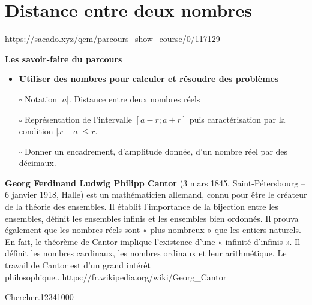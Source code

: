 \chapter{Distance entre deux nombres}
{https://sacado.xyz/qcm/parcours_show_course/0/117129}
{


 \begin{CpsCol}
\textbf{Les savoir-faire du parcours}
 \begin{itemize}
 \item \textbf{Utiliser des nombres pour calculer et résoudre des problèmes}
\item[$\square$] Notation $\vert a\vert$. Distance entre deux nombres réels
\item[$\square$] Représentation de l'intervalle $[a-r;a+r]$ puis caractérisation par la condition $\vert x-	a\vert \leq r$.
\item[$\square$] Donner un encadrement, d’amplitude donnée, d’un nombre réel par des décimaux.
 \end{itemize}
 \end{CpsCol}

\begin{His}
\textbf{Georg Ferdinand Ludwig Philipp Cantor} (3 mars 1845, Saint-Pétersbourg – 6 janvier 1918, Halle) est un mathématicien allemand, connu pour être le créateur de la théorie des ensembles. Il établit l'importance de la bijection entre les ensembles, définit les ensembles infinis et les ensembles bien ordonnés. Il prouva également que les nombres réels sont « plus nombreux » que les entiers naturels. En fait, le théorème de Cantor implique l'existence d'une « infinité d'infinis ». Il définit les nombres cardinaux, les nombres ordinaux et leur arithmétique. Le travail de Cantor est d'un grand intérêt philosophique...https://fr.wikipedia.org/wiki/Georg\_Cantor
\end{His}


\begin{ExoDec}{Chercher.}{1234}{1}{0}{0}{0}

\end{ExoDec}

}

